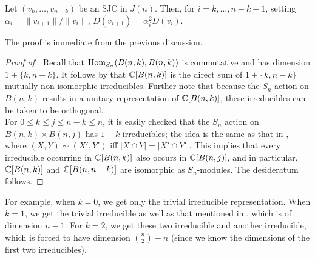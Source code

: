 	\begin{fprop}
		\label{prop:d-on-sjc}
		Let $(v_k,\ldots,v_{n-k})$ be an SJC in $J(n)$. Then, for $i=k,\ldots,n-k-1$, setting $\alpha_i = \|v_{i+1}\|/\|v_i\|$, $D(v_{i+1}) = \alpha_i^2 D(v_i)$.
	\end{fprop}
	The proof is immediate from the previous discussion.

	\begin{proof}[Proof of ]
		Recall that $\operatorname{Hom}_{S_n}(B(n,k),B(n,k))$ is commutative and has dimension $1+\{k,n-k\}$. It follows by  that $\mathbb{C}[B(n,k)]$ is the direct sum of $1+\{k,n-k\}$ mutually non-isomorphic irreducibles. Further note that because the $S_n$ action on $B(n,k)$ results in a unitary representation of $\mathbb{C}[B(n,k)]$, these irreducibles can be taken to be orthogonal. \\
		For $0 \le k \le j \le n-k \le n$, it is easily checked that the $S_n$ action on $B(n,k) \times B(n,j)$ has $1+k$ irreducibles; the idea is the same as that in , where $(X,Y) \sim (X',Y')$ iff $|X \cap Y| = |X' \cap Y'|$. 
		This implies that every irreducible occurring in $\mathbb{C}[B(n,k)]$ also occurs in $\mathbb{C}[B(n,j)]$, and in particular, $\mathbb{C}[B(n,k)]$ and $\mathbb{C}[B(n,n-k)]$ are isomorphic as $S_n$-modules. The desideratum follows.
	\end{proof}

	For example, when $k=0$, we get only the trivial irreducible representation. When $k=1$, we get the trivial irreducible as well as that mentioned in , which is of dimension $n-1$. For $k=2$, we get these two irreducible and another irreducible, which is forced to have dimension $\binom{n}{2} - n$ (since we know the dimensions of the first two irreducibles).

